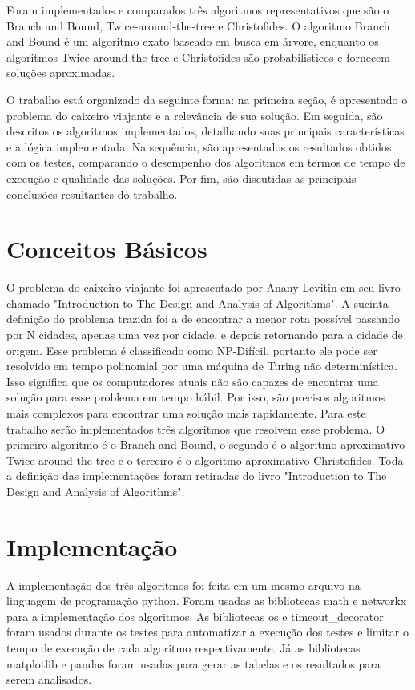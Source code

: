 \documentclass[12pt]{article}
\begin{document}
Foram implementados e comparados três algoritmos representativos que são o Branch and Bound, Twice-around-the-tree e Christofides. O algoritmo Branch and Bound é um algoritmo exato baseado em busca em árvore, enquanto os algoritmos Twice-around-the-tree e Christofides são probabilísticos e fornecem soluções aproximadas.

O trabalho está organizado da seguinte forma: na primeira seção, é apresentado o problema do caixeiro viajante e a relevância de sua solução. Em seguida, são descritos os algoritmos implementados, detalhando suas principais características e a lógica implementada. Na sequência, são apresentados os resultados obtidos com os testes, comparando o desempenho dos algoritmos em termos de tempo de execução e qualidade das soluções. Por fim, são discutidas as principais conclusões resultantes do trabalho.

\section{Conceitos Básicos}

O problema do caixeiro viajante foi apresentado por Anany Levitin em seu livro chamado "Introduction to The Design and Analysis of Algorithms". A sucinta definição do problema trazida foi a de encontrar a menor rota possível passando por N cidades, apenas uma vez por cidade, e depois retornando para a cidade de origem. Esse problema é classificado como  NP-Difícil, portanto ele pode ser resolvido em tempo polinomial por uma máquina de Turing não determinística. Isso significa que os computadores atuais não são capazes de encontrar uma solução para esse problema em tempo hábil. Por isso, são precisos algoritmos mais complexos para encontrar uma solução mais rapidamente. Para este trabalho serão implementados três algoritmos que resolvem esse problema. O primeiro algoritmo é o Branch and Bound, o segundo é o algoritmo aproximativo Twice-around-the-tree e o terceiro é o algoritmo aproximativo Christofides. Toda a definição das implementações foram retiradas do livro "Introduction to The Design and Analysis of Algorithms".

\section{Implementação}

A implementação dos três algoritmos foi feita em um mesmo arquivo na linguagem de programação python. Foram usadas as bibliotecas math e networkx para a implementação dos algoritmos. As bibliotecas os e timeout\_decorator foram usados durante os testes para automatizar a execução dos testes e limitar o tempo de execução de cada algoritmo respectivamente. Já as bibliotecas matplotlib e pandas foram usadas para gerar as tabelas e os resultados para serem analisados.
\end{document}
